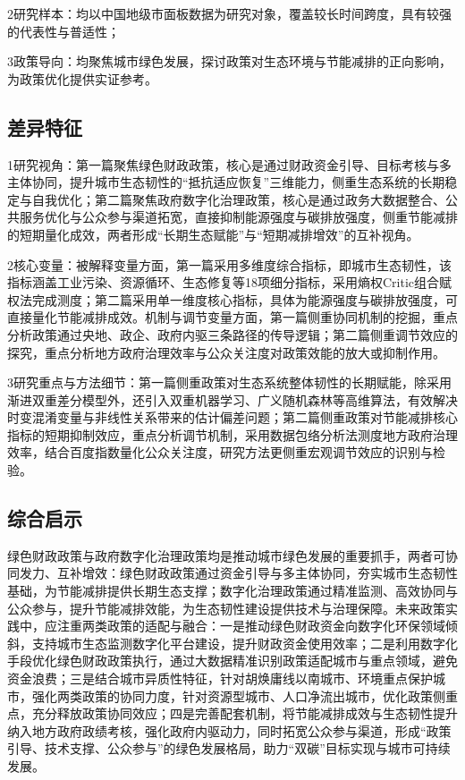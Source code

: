 \documentclass[lang=cn,a4paper,11pt]{elegantpaper}
\begin{document}
2\. 研究样本：均以中国地级市面板数据为研究对象，覆盖较长时间跨度，具有较强的代表性与普适性；

3\. 政策导向：均聚焦城市绿色发展，探讨政策对生态环境与节能减排的正向影响，为政策优化提供实证参考。
\subsection{差异特征}
1\. 研究视角：第一篇聚焦绿色财政政策，核心是通过财政资金引导、目标考核与多主体协同，提升城市生态韧性的“抵抗\-适应\-恢复”三维能力，侧重生态系统的长期稳定与自我优化；第二篇聚焦政府数字化治理政策，核心是通过政务大数据整合、公共服务优化与公众参与渠道拓宽，直接抑制能源强度与碳排放强度，侧重节能减排的短期量化成效，两者形成“长期生态赋能”与“短期减排增效”的互补视角。

2\. 核心变量：被解释变量方面，第一篇采用多维度综合指标，即城市生态韧性，该指标涵盖工业污染、资源循环、生态修复等18项细分指标，采用熵权\-Critic组合赋权法完成测度；第二篇采用单一维度核心指标，具体为能源强度与碳排放强度，可直接量化节能减排成效。机制与调节变量方面，第一篇侧重协同机制的挖掘，重点分析政策通过央地、政企、政府内驱三条路径的传导逻辑；第二篇侧重调节效应的探究，重点分析地方政府治理效率与公众关注度对政策效能的放大或抑制作用。

3\. 研究重点与方法细节：第一篇侧重政策对生态系统整体韧性的长期赋能，除采用渐进双重差分模型外，还引入双重机器学习、广义随机森林等高维算法，有效解决时变混淆变量与非线性关系带来的估计偏差问题；第二篇侧重政策对节能减排核心指标的短期抑制效应，重点分析调节机制，采用数据包络分析法测度地方政府治理效率，结合百度指数量化公众关注度，研究方法更侧重宏观调节效应的识别与检验。

\subsection{综合启示}

绿色财政政策与政府数字化治理政策均是推动城市绿色发展的重要抓手，两者可协同发力、互补增效：绿色财政政策通过资金引导与多主体协同，夯实城市生态韧性基础，为节能减排提供长期生态支撑；数字化治理政策通过精准监测、高效协同与公众参与，提升节能减排效能，为生态韧性建设提供技术与治理保障。未来政策实践中，应注重两类政策的适配与融合：一是推动绿色财政资金向数字化环保领域倾斜，支持城市生态监测数字化平台建设，提升财政资金使用效率；二是利用数字化手段优化绿色财政政策执行，通过大数据精准识别政策适配城市与重点领域，避免资金浪费；三是结合城市异质性特征，针对胡焕庸线以南城市、环境重点保护城市，强化两类政策的协同力度，针对资源型城市、人口净流出城市，优化政策侧重点，充分释放政策协同效应；四是完善配套机制，将节能减排成效与生态韧性提升纳入地方政府政绩考核，强化政府内驱动力，同时拓宽公众参与渠道，形成“政策引导、技术支撑、公众参与”的绿色发展格局，助力“双碳”目标实现与城市可持续发展。
\end{document}
